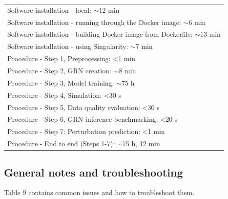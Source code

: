 \begin{tcolorbox}
\begin{tabular}{@{}l@{}}
Software installation - local: $\sim$12 min\\
Software installation - running through the Docker image: $\sim$6 min\\
Software installation - building Docker image from Dockerfile: $\sim$13 min\\
Software installation - using Singularity: $\sim$7 min\\
\addlinespace[0.8em]  %
Procedure - Step 1, Preprocessing: <1 min\\
Procedure - Step 2, GRN creation: $\sim$8 min\\
Procedure - Step 3, Model training: $\sim$75 h\\
Procedure - Step 4, Simulation: <30 s\\
Procedure - Step 5, Data quality evaluation: <30 s\\
Procedure - Step 6, GRN inference benchmarking: <20 s\\
Procedure - Step 7: Perturbation prediction: <1 min\\
Procedure - End to end (Steps 1-7): $\sim$75 h, 12 min
\end{tabular}

\subsection*{General notes and troubleshooting}

Table 9 contains common issues and how to troubleshoot them. 


\end{tcolorbox}
